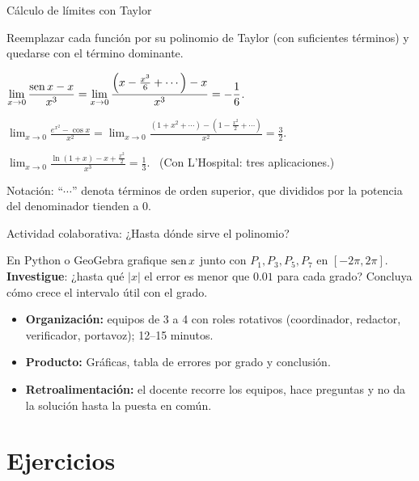 \documentclass[10pt,aspectratio=169]{beamer}
\begin{document}
\begin{frame}{Cálculo de límites con Taylor}
  \small
  \begin{idea}
    Reemplazar cada función por su polinomio de Taylor (con suficientes términos) y quedarse con el término dominante.
  \end{idea}
  \begin{ejemplo}[10]
    $\displaystyle\lim_{x\to0}\frac{\operatorname{sen} x-x}{x^3}=\lim_{x\to0}\frac{\left(x-\frac{x^3}{6}+\cdots\right)-x}{x^3}=-\frac16$.
  \end{ejemplo}
  \begin{ejemplo}[11]
    $\displaystyle\lim_{x\to0}\frac{e^{x^2}-\cos x}{x^2}=\lim_{x\to0}\frac{\left(1+x^2+\cdots\right)-\left(1-\frac{x^2}2+\cdots\right)}{x^2}=\frac32$.
  \end{ejemplo}
  \begin{ejemplo}[12]
    $\displaystyle\lim_{x\to0}\frac{\ln(1+x)-x+\frac{x^2}2}{x^3}=\frac13$. \ (Con L'Hospital: tres aplicaciones.)
  \end{ejemplo}
  \small Notación: ``$\cdots$'' denota términos de orden superior, que divididos por la potencia del denominador tienden a $0$.
\end{frame}

\begin{frame}{Actividad colaborativa: ¿Hasta dónde sirve el polinomio?}
  \small
  \begin{activa}
    En Python o GeoGebra grafique $\operatorname{sen} x$ junto con $P_1,P_3,P_5,P_7$ en $[-2\pi,2\pi]$. \textbf{Investigue}: ¿hasta qué $|x|$ el error es menor que $0.01$ para cada grado? Concluya cómo crece el intervalo útil con el grado.
  \end{activa}
  \begin{itemize}
    \item \textbf{Organización:} equipos de 3 a 4 con roles rotativos (coordinador, redactor, verificador, portavoz); 12--15 minutos.
    \item \textbf{Producto:} Gráficas, tabla de errores por grado y conclusión.
    \item \textbf{Retroalimentación:} el docente recorre los equipos, hace preguntas y no da la solución hasta la puesta en común.
  \end{itemize}
\end{frame}

\section{Ejercicios}
\end{document}

